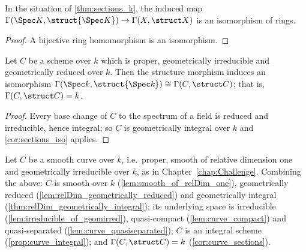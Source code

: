 \begin{corollary}
  \label{cor:sections_iso}
  \leanok
  In the situation of \ref{thm:sections_k}, the induced map
  \(\Gamma(\Spec K, \struct{\Spec K}) \to \Gamma(X, \struct X)\) is an isomorphism of rings.
\end{corollary}
\begin{proof}
  \leanok
  A bijective ring homomorphism is an isomorphism.
\end{proof}

\begin{corollary}
  \label{cor:curve_sections}
  \leanok
  Let \(C\) be a scheme over \(k\) which is proper, geometrically irreducible and
  geometrically reduced over \(k\). Then the structure morphism induces an isomorphism
  \(\Gamma(\Spec k, \struct{\Spec k}) \cong \Gamma(C, \struct C)\); that is,
  \(\Gamma(C, \struct C) = k\).
\end{corollary}
\begin{proof}
  \leanok
  Every base change of \(C\) to the spectrum of a field is reduced and irreducible, hence
  integral; so \(C\) is geometrically integral over \(k\) and \ref{cor:sections_iso} applies.
\end{proof}

\begin{remark}
  \label{rem:curve_bundle}
  \leanok
  Let \(C\) be a smooth curve over \(k\), i.e.\ proper, smooth of relative dimension one and
  geometrically irreducible over \(k\), as in Chapter~\ref{chap:Challenge}. Combining the
  above: \(C\) is smooth over \(k\) (\ref{lem:smooth_of_relDim_one}), geometrically reduced
  (\ref{lem:relDim_geometrically_reduced}) and geometrically integral
  (\ref{thm:relDim_geometrically_integral}); its underlying space is irreducible
  (\ref{lem:irreducible_of_geomirred}), quasi-compact (\ref{lem:curve_compact}) and
  quasi-separated (\ref{lem:curve_quasiseparated}); \(C\) is an integral scheme
  (\ref{prop:curve_integral}); and \(\Gamma(C, \struct C) = k\) (\ref{cor:curve_sections}).
\end{remark}

